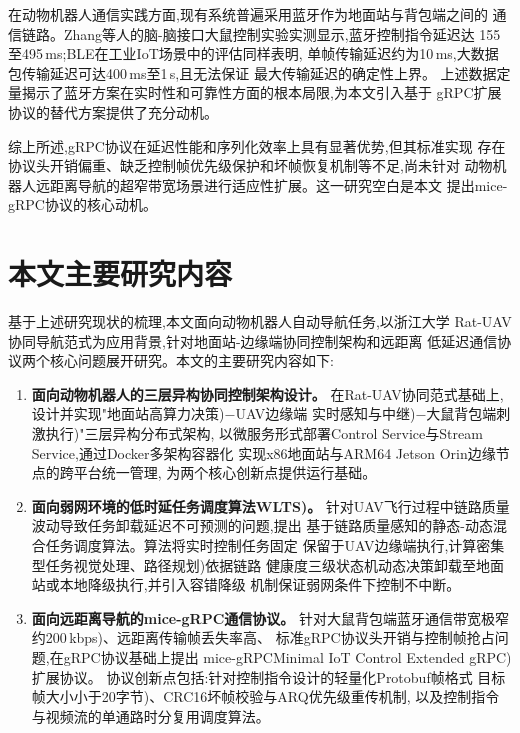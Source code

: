 在动物机器人通信实践方面,现有系统普遍采用蓝牙作为地面站与背包端之间的
通信链路。Zhang等人的脑-脑接口大鼠控制实验实测显示,蓝牙控制指令延迟达
155至495\,ms\cite{zhang2019bci};BLE在工业IoT场景中的评估同样表明,
单帧传输延迟约为10\,ms,大数据包传输延迟可达400\,ms至1\,s,且无法保证
最大传输延迟的确定性上界\cite{PlaceholderBLE2017}。
上述数据定量揭示了蓝牙方案在实时性和可靠性方面的根本局限,为本文引入基于
gRPC扩展协议的替代方案提供了充分动机。
 
综上所述,gRPC协议在延迟性能和序列化效率上具有显著优势,但其标准实现
存在协议头开销偏重、缺乏控制帧优先级保护和坏帧恢复机制等不足,尚未针对
动物机器人远距离导航的超窄带宽场景进行适应性扩展。这一研究空白是本文
提出mice-gRPC协议的核心动机。

\section{本文主要研究内容}

基于上述研究现状的梳理,本文面向动物机器人自动导航任务,以浙江大学
Rat-UAV协同导航范式为应用背景,针对地面站-边缘端协同控制架构和远距离
低延迟通信协议两个核心问题展开研究。本文的主要研究内容如下:
 
\begin{enumerate}[leftmargin=2em, label=(\arabic*)]
 
  \item \textbf{面向动物机器人的三层异构协同控制架构设计。}
  在Rat-UAV协同范式基础上,设计并实现"地面站高算力决策)$-$UAV边缘端
  实时感知与中继)$-$大鼠背包端刺激执行)"三层异构分布式架构,
  以微服务形式部署Control Service与Stream Service,通过Docker多架构容器化
  实现x86地面站与ARM64 Jetson Orin边缘节点的跨平台统一管理,
  为两个核心创新点提供运行基础。
 
  \item \textbf{面向弱网环境的低时延任务调度算法WLTS)。}
  针对UAV飞行过程中链路质量波动导致任务卸载延迟不可预测的问题,提出
  基于链路质量感知的静态-动态混合任务调度算法。算法将实时控制任务固定
  保留于UAV边缘端执行,计算密集型任务视觉处理、路径规划)依据链路
  健康度三级状态机动态决策卸载至地面站或本地降级执行,并引入容错降级
  机制保证弱网条件下控制不中断。
 
  \item \textbf{面向远距离导航的mice-gRPC通信协议。}
  针对大鼠背包端蓝牙通信带宽极窄约200\,kbps)、远距离传输帧丢失率高、
  标准gRPC协议头开销与控制帧抢占问题,在gRPC协议基础上提出
  mice-gRPCMinimal IoT Control Extended gRPC)扩展协议。
  协议创新点包括:针对控制指令设计的轻量化Protobuf帧格式
  目标帧大小小于20字节)、CRC16坏帧校验与ARQ优先级重传机制,
  以及控制指令与视频流的单通路时分复用调度算法。
 
\end{enumerate}
 
